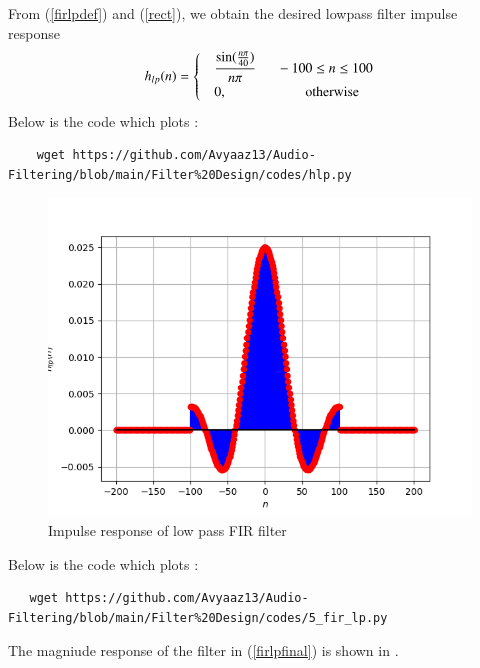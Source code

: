 \documentclass[article]{IEEEtran}
\theoremstyle{remark}
\numberwithin{equation}{subsection}
\begin{document}
From (\ref{firlpdef}) and (\ref{rect}), we obtain the desired lowpass filter impulse response
\begin{align}
h_{lp}(n) =
\begin{cases}
\label{firlpfinal}
& \dfrac{\sin(\frac{n\pi}{40})}{n\pi} \indent -100 \leq n \leq 100  \\
& 0, \hspace{2cm} \mbox{otherwise}
\end{cases}
\end{align}
Below is the code which plots :
\begin{lstlisting}
    wget https://github.com/Avyaaz13/Audio-Filtering/blob/main/Filter%20Design/codes/hlp.py
\end{lstlisting}
\begin{figure}[!ht]
    \centering
    \includegraphics[width = \columnwidth]{figs/h(n).png}
    \caption{Impulse response of low pass FIR filter}
    \label{hn_lp}
\end{figure}
Below is the code which plots :
\begin{lstlisting}
   wget https://github.com/Avyaaz13/Audio-Filtering/blob/main/Filter%20Design/codes/5_fir_lp.py
\end{lstlisting}
The magniude  response of the filter in (\ref{firlpfinal}) is shown in .
\end{document}
